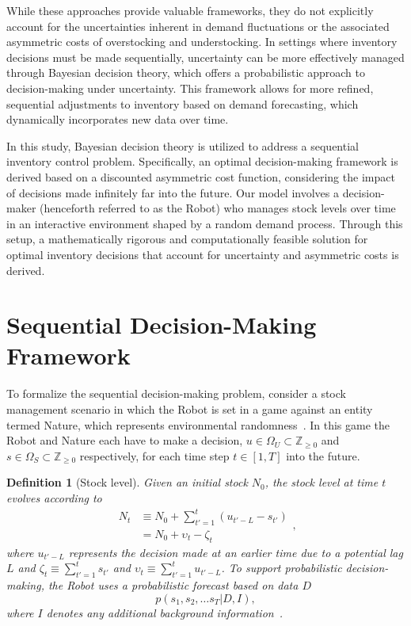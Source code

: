\documentclass[a4paper,12pt]{article}
\newtheorem{definition}{Definition}
\begin{document}
	While these approaches provide valuable frameworks, they do not explicitly account for the uncertainties inherent in demand fluctuations or the associated asymmetric costs of overstocking and understocking. In settings where inventory decisions must be made sequentially, uncertainty can be more effectively managed through Bayesian decision theory, which offers a probabilistic approach to decision-making under uncertainty. This framework allows for more refined, sequential adjustments to inventory based on demand forecasting, which dynamically incorporates new data over time.
	
	In this study, Bayesian decision theory is utilized to address a sequential inventory control problem. Specifically, an optimal decision-making framework is derived based on a discounted asymmetric cost function, considering the impact of decisions made infinitely far into the future. Our model involves a decision-maker (henceforth referred to as the Robot) who manages stock levels over time in an interactive environment shaped by a random demand process. Through this setup, a mathematically rigorous and computationally feasible solution for optimal inventory decisions that account for uncertainty and asymmetric costs is derived.
	
	\section{Sequential Decision-Making Framework}
	To formalize the sequential decision-making problem, consider a stock management scenario in which the Robot is set in a game against an entity termed Nature, which represents environmental randomness~\citep{lavalle2006}. In this game the Robot and Nature each have to make a decision, $u\in \Omega_U\subset \mathbb{Z}_{\geq 0}$ and $s\in \Omega_S\subset \mathbb{Z}_{\geq 0}$ respectively, for each time step $t\in [1,T]$ into the future. 
	\begin{definition}[Stock level]
		\label{def:stock}
		Given an initial stock $N_0$, the stock level at time $t$ evolves according to
		\begin{equation}
			\begin{split}
				N_t &\equiv N_0 + \sum_{t'=1}^{t} (u_{t'-L} - s_{t'})\\
				& = N_0+\upsilon_t-\zeta_t
			\end{split},
		\end{equation}
		where $u_{t'-L}$ represents the decision made at an earlier time due to a potential lag $L$ and $\zeta_t\equiv \sum_{t'=1}^ts_{t'}$ and $\upsilon_t\equiv \sum_{t'=1}^tu_{t'-L}$. To support probabilistic decision-making, the Robot uses a probabilistic forecast based on data $D$
		\begin{equation}
			p(s_1, s_2, \dots s_T| D, I),
		\end{equation}
		where $I$ denotes any additional background information~\citep{Sivia2006}.
	\end{definition}
\end{document}
